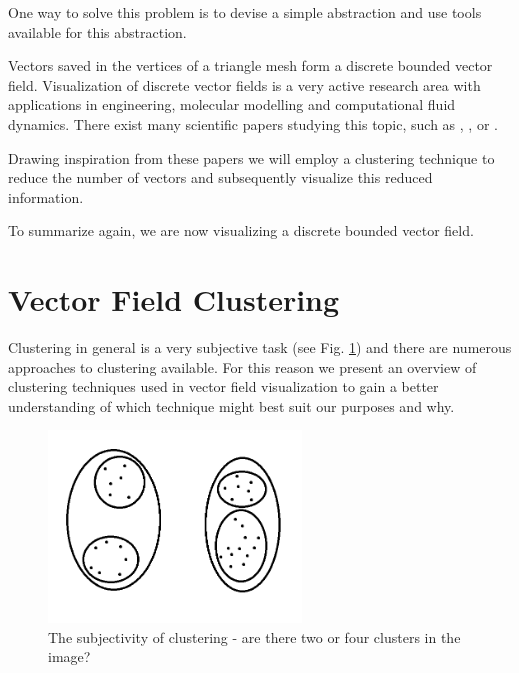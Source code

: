 One way to solve this problem is to devise a simple abstraction and use tools available for this abstraction.

Vectors saved in the vertices of a triangle mesh form a discrete bounded vector field. Visualization of discrete vector fields is a very active research area with applications in engineering, molecular modelling and computational fluid dynamics. There exist many scientific papers studying this topic, such as \citet{Telea99}, \citet{Garcke00}, \citet{Du04} or \citet{Peng12}.

Drawing inspiration from these papers we will employ a clustering technique to reduce the number of vectors and subsequently visualize this reduced information.

To summarize again, we are now visualizing a discrete bounded vector field.

\section{Vector Field Clustering}

Clustering in general is a very subjective task (see Fig. \ref{fig:clustering_subjectivity}) and there are numerous approaches to clustering available. For this reason we present an overview of clustering techniques used in vector field visualization to gain a better understanding of which technique might best suit our purposes and why.

\begin{figure}[h]
\centering
\includegraphics[width=0.6\textwidth]{./img/clustering_subjectivity.png}
\caption[The subjectivity of clustering]{The subjectivity of clustering - are there two or four clusters in the image?}
\label{fig:clustering_subjectivity}
\end{figure}

